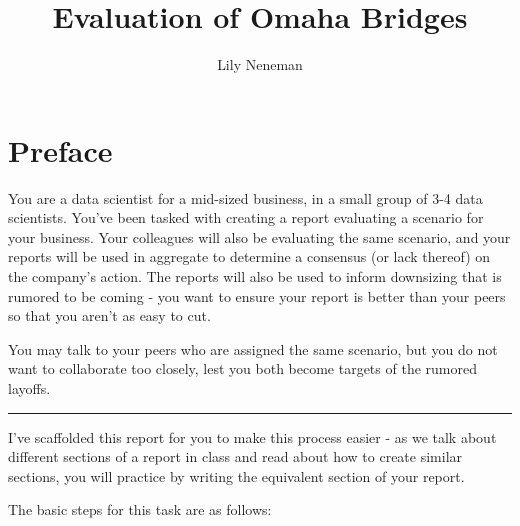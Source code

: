 \documentclass[
  letterpaper,
  DIV=11,
  numbers=noendperiod]{scrreprt}
\title{Evaluation of Omaha Bridges}
\author{Lily Neneman}
\date{}
\renewcommand*\contentsname{Table of contents}
\newcommand\contentsname{Table of contents}
\begin{document}
\maketitle

\renewcommand*\contentsname{Table of contents}
{
\hypersetup{linkcolor=}
\setcounter{tocdepth}{2}
\tableofcontents
}


\chapter*{Preface}\label{preface}


You are a data scientist for a mid-sized business, in a small group of
3-4 data scientists. You've been tasked with creating a report
evaluating a scenario for your business. Your colleagues will also be
evaluating the same scenario, and your reports will be used in aggregate
to determine a consensus (or lack thereof) on the company's action. The
reports will also be used to inform downsizing that is rumored to be
coming - you want to ensure your report is better than your peers so
that you aren't as easy to cut.

You may talk to your peers who are assigned the same scenario, but you
do not want to collaborate too closely, lest you both become targets of
the rumored layoffs.

\begin{center}\rule{0.5\linewidth}{0.5pt}\end{center}

I've scaffolded this report for you to make this process easier - as we
talk about different sections of a report in class and read about how to
create similar sections, you will practice by writing the equivalent
section of your report.

The basic steps for this task are as follows:
\end{document}
